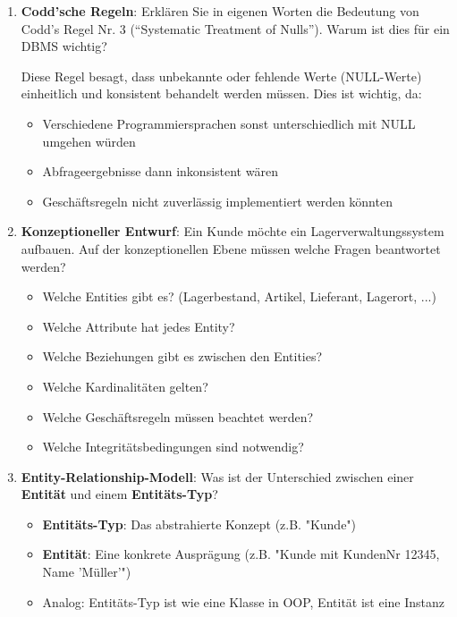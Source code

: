 \documentclass[a4paper]{article}
\begin{document}
\begin{enumerate}
    \item \textbf{Codd'sche Regeln}: Erklären Sie in eigenen Worten die Bedeutung von Codd's Regel 
    Nr. 3 (``Systematic Treatment of Nulls''). Warum ist dies für ein DBMS wichtig?
    
    Diese Regel besagt, dass unbekannte oder fehlende Werte (NULL-Werte) einheitlich und konsistent 
    behandelt werden müssen. Dies ist wichtig, da:
    \begin{itemize}
        \item Verschiedene Programmiersprachen sonst unterschiedlich mit NULL umgehen würden
        \item Abfrageergebnisse dann inkonsistent wären
        \item Geschäftsregeln nicht zuverlässig implementiert werden könnten
    \end{itemize}
    
    \newpage
    \item \textbf{Konzeptioneller Entwurf}: Ein Kunde möchte ein Lagerverwaltungssystem aufbauen. 
    Auf der konzeptionellen Ebene müssen welche Fragen beantwortet werden?
    
    \begin{itemize}
        \item Welche Entities gibt es? (Lagerbestand, Artikel, Lieferant, Lagerort, ...)
        \item Welche Attribute hat jedes Entity?
        \item Welche Beziehungen gibt es zwischen den Entities?
        \item Welche Kardinalitäten gelten?
        \item Welche Geschäftsregeln müssen beachtet werden?
        \item Welche Integritätsbedingungen sind notwendig?
    \end{itemize}
    
    \item \textbf{Entity-Relationship-Modell}: Was ist der Unterschied zwischen einer 
    \textbf{Entität} und einem \textbf{Entitäts-Typ}?
    
    \begin{itemize}
        \item \textbf{Entitäts-Typ}: Das abstrahierte Konzept (z.B. "Kunde")
        \item \textbf{Entität}: Eine konkrete Ausprägung (z.B. "Kunde mit KundenNr 12345, Name 'Müller'")
        \item Analog: Entitäts-Typ ist wie eine Klasse in OOP, Entität ist eine Instanz
    \end{itemize}
    

\end{enumerate}
\end{document}
